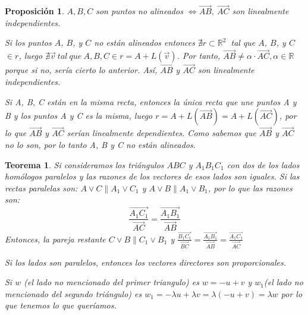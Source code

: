 \documentclass[11pt, a4paper, titlepage]{article}
\makeatletter
\renewenvironment{proof}[1][\proofname] {\vspace{-15pt}\par\pushQED{\qed}\normalfont\topsep6\p@\@plus6\p@\relax\trivlist\item[\hskip\labelsep\it#1\@addpunct{.}]\ignorespaces}{\popQED\endtrivlist\@endpefalse}
\renewcommand{\vec}{\overrightarrow}
\renewenvironment{proof}[1][\proofname] {\par\pushQED{\qed}\normalfont\topsep6\p@\@plus6\p@\relax\trivlist\item[\hskip\labelsep\itshape\sffamily#1\@addpunct{.}]\ignorespaces}{\popQED\endtrivlist\@endpefalse}
\theoremstyle{theorem-style}
\newtheorem{nth}{Teorema}[section]
\newtheorem{nprop}{Proposición}[section]
\theoremstyle{definition-style}
\theoremstyle{remark-style}
\theoremstyle{example-style}
\makeatother
\begin{document}
\begin{nprop}
  $A,B,C$ son puntos no alineados  $ \iff \overrightarrow{AB}, \ \overrightarrow{AC}$ son linealmente independientes.
  \begin {proof}

    \boxed{\Rightarrow}
    Si los puntos $A$, $B$, y $C$ no están alineados entonces $\nexists r \subset \mathbb{R}^2\ $ tal que $A$, $B$, y $C$ $\in r$, luego $\nexists \vec{v}\ tal\ que\ A,B,C \in r = A + L(\vec{v})$. Por tanto, $\overrightarrow{AB} \neq \alpha \cdot \overrightarrow{AC}, \alpha \in \mathbb{R}\ $ porque si no, sería cierto lo anterior. Así, $\overrightarrow{AB}$ y $\overrightarrow{AC}$ son linealmente independientes.

    \boxed{\Leftarrow} Si A, B, C están en la misma recta, entonces la única recta que une puntos A y B y los puntos A y C es la misma, luego $r = A + L(\overrightarrow{AB})  = A + L(\overrightarrow{AC})$, por lo que $\overrightarrow{AB}$ y $\overrightarrow{AC}$ serían linealmente dependientes. Como sabemos que $\overrightarrow{AB}$ y $\overrightarrow{AC}$ no lo son, por lo tanto A, B y C no están alineados.
  \end {proof}

\end{nprop}




\begin{nth}
  Si consideramos los triángulos $ABC$ y $A_1B_1C_1$ con dos de los lados homólogos paralelos y las razones de los vectores de esos lados son iguales.
  Si las rectas paralelas son: $A\vee C \parallel A_1\vee C_1$ y $A\vee B \parallel A_1\vee B_1$, por lo que las razones son:
  \[
    \frac{\vec{A_1C_1}}{\vec{AC}} = \frac{\vec{A_1B_1}}{\vec{AB}}
  \]
  Entonces, la pareja restante $C\vee B \parallel C_1\vee B_1$ y $\frac{\vec{B_1C_1}}{\vec{BC}} = \frac{\vec{A_1B_1}}{\vec{AB}} = \frac{\vec{A_1C_1}}{\vec{AC}}$\\
  \begin{proof}
    Si los lados son paralelos, entonces los vectores directores son proporcionales.

    Si $w$ (el lado no mencionado del primer triangulo) es $w=-u+v$ y $w_1$(el lado no mencionado del segundo triángulo) es $w_1 = - \lambda u + \lambda v = \lambda (-u+v) = \lambda w$  por lo que tenemos lo que queríamos.
  \end{proof}
\end{nth}
\end{document}
